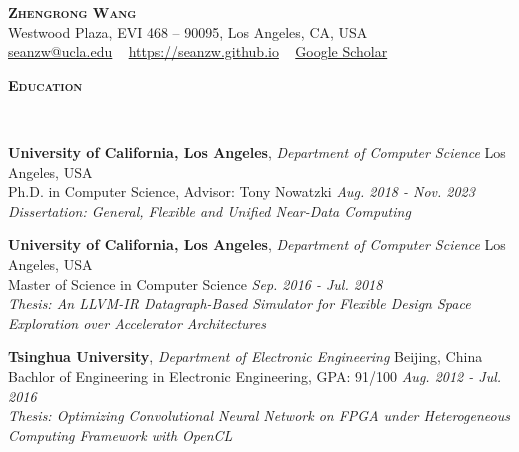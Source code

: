 \documentclass[a4paper]{article}
\def\justifying{%
  \rightskip=0pt
  \spaceskip=0pt
  \xspaceskip=0pt
  \relax
}
\newenvironment{changemargin}[2]{%
  \begin{list}{}{%
    \setlength{\topsep}{0pt}%
    \setlength{\leftmargin}{#1}%
    \setlength{\rightmargin}{#2}%
    \setlength{\listparindent}{\parindent}%
    \setlength{\itemindent}{\parindent}%
    \setlength{\parsep}{\parskip}%
  }%
  \item[]}{\end{list}
}
\newcommand{\lineover}{
	\begin{changemargin}{-0.05in}{-0.05in}
		\vspace*{-8pt}
		\hrulefill \\
		\vspace*{-2pt}
	\end{changemargin}
}
\newcommand{\header}[1]{
	\begin{changemargin}{-0.5in}{-0.5in}
		\scshape{\large \textbf{#1}}\\
  	\lineover
	\end{changemargin}
}
\newcommand{\thesis}[1]{
	\small\emph{#1}\normalsize
}
\newcommand{\contact}[4]{
	\begin{changemargin}{-0.5in}{-0.5in}
		\begin{center}
			{\LARGE \scshape \textbf{#1}}\\ \smallskip
			404 Westwood Plaza, EVI 468 – 90095, Los Angeles, CA, USA\\ \smallskip
			{\href{#2}{#2}} ~ \smallskip 
			{\href{#3}{#3}} ~
			{\href{#4}{Google Scholar}}\smallskip
		\end{center}
	\end{changemargin}
}
\newenvironment{body} {
	\vspace*{-16pt}
	\begin{changemargin}{-0.5in}{-0.5in}
  }	
	{\end{changemargin}
}
\begin{document}
\contact{Zhengrong Wang}{seanzw@ucla.edu}{https://seanzw.github.io}{https://scholar.google.com/citations?user=h\_GwGfQAAAAJ\&hl=en}


	




\header{Education}

\begin{body}
	\vspace{14pt}

	\textbf{University of California, Los Angeles}, \emph{Department of Computer Science} \hfill Los Angeles, USA \\
Ph.D. in Computer Science, Advisor: Tony Nowatzki \hfill \emph{Aug. 2018 - Nov. 2023}{} \\
\thesis{Dissertation: General, Flexible and Unified Near-Data Computing} \\

\vspace{6pt}

	\textbf{University of California, Los Angeles}, \emph{Department of Computer Science} \hfill Los Angeles, USA \\
Master of Science in Computer Science \hfill \emph{Sep. 2016 - Jul. 2018}{} \\
\thesis{Thesis: An LLVM-IR Datagraph-Based Simulator for Flexible Design Space Exploration over Accelerator Architectures} \\

\vspace{6pt}

	\textbf{Tsinghua University}, \emph{Department of Electronic Engineering} \hfill Beijing, China \\
Bachlor of Engineering in Electronic Engineering, GPA: 91/100 \hfill \emph{Aug. 2012 - Jul. 2016}{} \\
\thesis{Thesis: Optimizing Convolutional Neural Network on FPGA under Heterogeneous Computing Framework with OpenCL} \\
\vspace{6pt}


\end{body}
\end{document}
